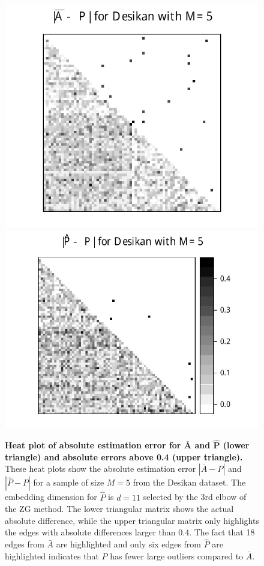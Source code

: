 \documentclass[10pt,letterpaper]{article}
\renewcommand{\hat}{\widehat}
\begin{document}
\begin{figure}

\begin{center}
  \includegraphics[height=.4\linewidth]{Diff2_desikan_m5.pdf}\hspace{-12pt}
  \includegraphics[height=.4\linewidth]{Diff3_desikan_m5.pdf}
\end{center}

\caption{{\bf Heat plot of absolute estimation error for $\bm{\bar{A}}$ and $\bm{\hat{P}}$ (lower triangle) and absolute errors above 0.4 (upper triangle).}
These heat plots show the absolute estimation error $|\bar{A} - P|$ and $|\hat{P} - P|$ for a sample of size $M=5$ from the Desikan dataset.
The embedding dimension for $\hat{P}$ is $d=11$ selected by the 3rd elbow of the ZG method. The lower triangular matrix shows the actual absolute difference, while the upper triangular matrix only highlights the edges with absolute differences larger than $0.4$. The fact that 18 edges from $\bar{A}$ are highlighted and only six edges from $\hat{P}$ are highlighted indicates that $\hat{P}$ has fewer large outliers compared to $\bar{A}$.
}
\label{fig:Diff_desikan_m5}
\end{figure}
\end{document}
